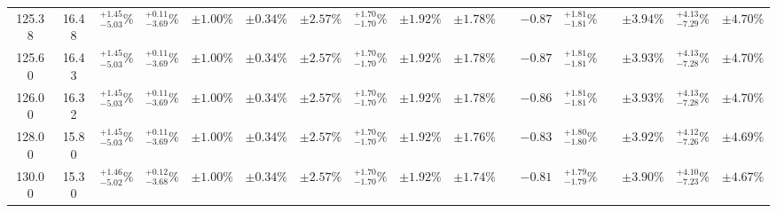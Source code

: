 \begin{landscape}
\begin{table}[ht!]
{\begin{tabular}{| cc | cccc | ccc | c |@{}c@{\;}| cc |@{}c@{\;}| ccc |}
125.38 & 16.48 & \({}^{ +1.45}_{ -5.03}\%\) & {\color{black!55}\({}^{ +0.11}_{ -3.69}\%\)} & {\color{black!55}\(\pm{  1.00}\%\)} & {\color{black!55}\(\pm{  0.34}\%\)} & \(\pm 2.57\%\) & {\color{black!55}\({}^{ +1.70}_{ -1.70}\%\)} & {\color{black!55}\(\pm 1.92\%\)} & \(\pm{  1.78}\%\) &  & \(-0.87\) & \({}^{ +1.81}_{ -1.81}\%\) &  & \(\pm 3.94\%\) & \({}^{ +4.13}_{ -7.29}\%\) & \(\pm 4.70\%\)\\
125.60 & 16.43 & \({}^{ +1.45}_{ -5.03}\%\) & {\color{black!55}\({}^{ +0.11}_{ -3.69}\%\)} & {\color{black!55}\(\pm{  1.00}\%\)} & {\color{black!55}\(\pm{  0.34}\%\)} & \(\pm 2.57\%\) & {\color{black!55}\({}^{ +1.70}_{ -1.70}\%\)} & {\color{black!55}\(\pm 1.92\%\)} & \(\pm{  1.78}\%\) &  & \(-0.87\) & \({}^{ +1.81}_{ -1.81}\%\) &  & \(\pm 3.93\%\) & \({}^{ +4.13}_{ -7.28}\%\) & \(\pm 4.70\%\)\\
126.00 & 16.32 & \({}^{ +1.45}_{ -5.03}\%\) & {\color{black!55}\({}^{ +0.11}_{ -3.69}\%\)} & {\color{black!55}\(\pm{  1.00}\%\)} & {\color{black!55}\(\pm{  0.34}\%\)} & \(\pm 2.57\%\) & {\color{black!55}\({}^{ +1.70}_{ -1.70}\%\)} & {\color{black!55}\(\pm 1.92\%\)} & \(\pm{  1.78}\%\) &  & \(-0.86\) & \({}^{ +1.81}_{ -1.81}\%\) &  & \(\pm 3.93\%\) & \({}^{ +4.13}_{ -7.28}\%\) & \(\pm 4.70\%\)\\
128.00 & 15.80 & \({}^{ +1.45}_{ -5.03}\%\) & {\color{black!55}\({}^{ +0.11}_{ -3.69}\%\)} & {\color{black!55}\(\pm{  1.00}\%\)} & {\color{black!55}\(\pm{  0.34}\%\)} & \(\pm 2.57\%\) & {\color{black!55}\({}^{ +1.70}_{ -1.70}\%\)} & {\color{black!55}\(\pm 1.92\%\)} & \(\pm{  1.76}\%\) &  & \(-0.83\) & \({}^{ +1.80}_{ -1.80}\%\) &  & \(\pm 3.92\%\) & \({}^{ +4.12}_{ -7.26}\%\) & \(\pm 4.69\%\)\\
130.00 & 15.30 & \({}^{ +1.46}_{ -5.02}\%\) & {\color{black!55}\({}^{ +0.12}_{ -3.68}\%\)} & {\color{black!55}\(\pm{  1.00}\%\)} & {\color{black!55}\(\pm{  0.34}\%\)} & \(\pm 2.57\%\) & {\color{black!55}\({}^{ +1.70}_{ -1.70}\%\)} & {\color{black!55}\(\pm 1.92\%\)} & \(\pm{  1.74}\%\) &  & \(-0.81\) & \({}^{ +1.79}_{ -1.79}\%\) &  & \(\pm 3.90\%\) & \({}^{ +4.10}_{ -7.23}\%\) & \(\pm 4.67\%\)\\
\cline{1-10} \cline{12-13} \cline{15-17}
\end{tabular}
}
\end{table}


\end{landscape}
